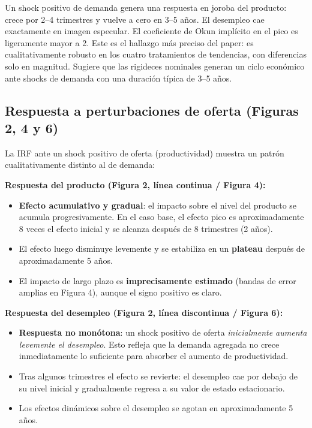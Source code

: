 \documentclass[12pt]{article}
\begin{document}
\begin{hallazgo}
Un shock positivo de demanda genera una respuesta en joroba del producto: crece por 2--4 trimestres y vuelve a cero en 3--5 a\~nos. El desempleo cae exactamente en imagen especular. El coeficiente de Okun impl\'icito en el pico es ligeramente mayor a 2. Este es el hallazgo m\'as preciso del paper: es cualitativamente robusto en los cuatro tratamientos de tendencias, con diferencias solo en magnitud. Sugiere que las rigideces nominales generan un ciclo econ\'omico ante shocks de demanda con una duraci\'on t\'ipica de 3--5 a\~nos.
\end{hallazgo}

\subsection{Respuesta a perturbaciones de oferta (Figuras 2, 4 y 6)}

La IRF ante un shock positivo de oferta (productividad) muestra un patr\'on cualitativamente distinto al de demanda:

\textbf{Respuesta del producto (Figura 2, l\'inea continua / Figura 4):}
\begin{itemize}
  \item \textbf{Efecto acumulativo y gradual}: el impacto sobre el nivel del producto se acumula progresivamente. En el caso base, el efecto pico es aproximadamente 8 veces el efecto inicial y se alcanza despu\'es de 8 trimestres (2 a\~nos).
  \item El efecto luego disminuye levemente y se estabiliza en un \textbf{plateau} despu\'es de aproximadamente 5 a\~nos.
  \item El impacto de largo plazo es \textbf{imprecisamente estimado} (bandas de error amplias en Figura 4), aunque el signo positivo es claro.
\end{itemize}

\textbf{Respuesta del desempleo (Figura 2, l\'inea discontinua / Figura 6):}
\begin{itemize}
  \item \textbf{Respuesta no mon\'otona}: un shock positivo de oferta \emph{inicialmente aumenta levemente el desempleo}. Esto refleja que la demanda agregada no crece inmediatamente lo suficiente para absorber el aumento de productividad.
  \item Tras algunos trimestres el efecto se revierte: el desempleo cae por debajo de su nivel inicial y gradualmente regresa a su valor de estado estacionario.
  \item Los efectos din\'amicos sobre el desempleo se agotan en aproximadamente 5 a\~nos.
\end{itemize}
\end{document}
